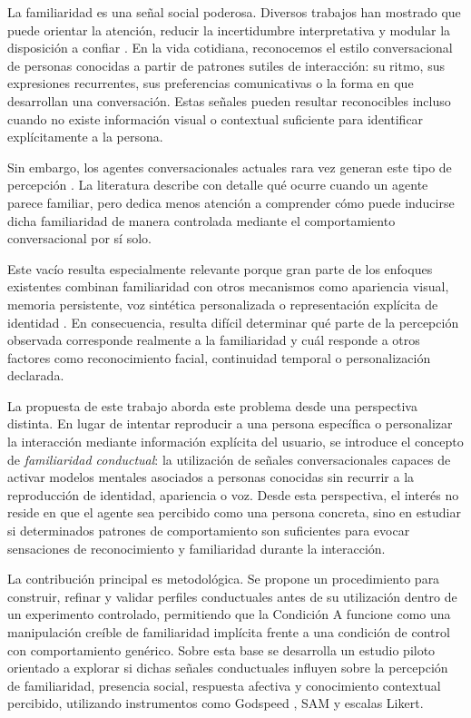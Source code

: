 \documentclass[sigconf, nonacm, language=spanish]{acmart}
\begin{document}
La familiaridad es una señal social poderosa. Diversos trabajos han mostrado que puede orientar la atención, reducir la incertidumbre interpretativa y modular la disposición a confiar \cite{garciamarques_familiarity_2007, poletaykina_knowing_2025}. En la vida cotidiana, reconocemos el estilo conversacional de personas conocidas a partir de patrones sutiles de interacción: su ritmo, sus expresiones recurrentes, sus preferencias comunicativas o la forma en que desarrollan una conversación. Estas señales pueden resultar reconocibles incluso cuando no existe información visual o contextual suficiente para identificar explícitamente a la persona.

Sin embargo, los agentes conversacionales actuales rara vez generan este tipo de percepción \cite{yang_exploring_2025}. La literatura describe con detalle qué ocurre cuando un agente parece familiar, pero dedica menos atención a comprender cómo puede inducirse dicha familiaridad de manera controlada mediante el comportamiento conversacional por sí solo.

Este vacío resulta especialmente relevante porque gran parte de los enfoques existentes combinan familiaridad con otros mecanismos como apariencia visual, memoria persistente, voz sintética personalizada o representación explícita de identidad \cite{poletaykina_knowing_2025, yang_exploring_2025}. En consecuencia, resulta difícil determinar qué parte de la percepción observada corresponde realmente a la familiaridad y cuál responde a otros factores como reconocimiento facial, continuidad temporal o personalización declarada.

La propuesta de este trabajo aborda este problema desde una perspectiva distinta. En lugar de intentar reproducir a una persona específica o personalizar la interacción mediante información explícita del usuario, se introduce el concepto de \emph{familiaridad conductual}: la utilización de señales conversacionales capaces de activar modelos mentales asociados a personas conocidas sin recurrir a la reproducción de identidad, apariencia o voz. Desde esta perspectiva, el interés no reside en que el agente sea percibido como una persona concreta, sino en estudiar si determinados patrones de comportamiento son suficientes para evocar sensaciones de reconocimiento y familiaridad durante la interacción.

La contribución principal es metodológica. Se propone un procedimiento para construir, refinar y validar perfiles conductuales antes de su utilización dentro de un experimento controlado, permitiendo que la Condición A funcione como una manipulación creíble de familiaridad implícita frente a una condición de control con comportamiento genérico. Sobre esta base se desarrolla un estudio piloto orientado a explorar si dichas señales conductuales influyen sobre la percepción de familiaridad, presencia social, respuesta afectiva y conocimiento contextual percibido, utilizando instrumentos como Godspeed \cite{bartneck_measurement_2009}, SAM \cite{bradley_measures_1994} y escalas Likert.
\end{document}
